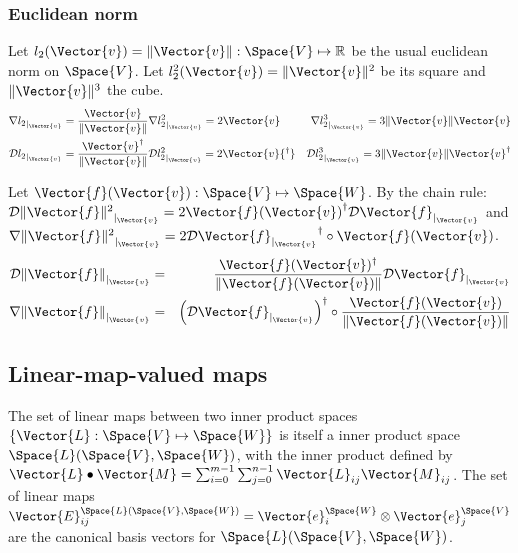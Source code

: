 
\subsubsection{Euclidean norm}
\label{sec:derivatives-of-euclidean-norm}

Let $l_2(\Vector{v}) = \| \Vector{v}  \|: \Space{V} \mapsto \Reals$
be the usual euclidean norm on $\Space{V}$.
Let $l_2^2(\Vector{v}) = \| \Vector{v}  \|^2 $
be its square and $ \| \Vector{v}  \|^3$ the cube.
\begin{eqnarray}
\label{eq:l2-gradient}
\Gb{l_2}{\Vector{v}} = \frac{ \Vector{v} }{ \| \Vector{v}  \|} &
\Gb{l_2^2}{\Vector{v}} =  2\Vector{v} &
\Gb{l_2^3}{\Vector{v}} = 3 \| \Vector{v}  \| \Vector{v} \\
\Db{l_2}{\Vector{v}} = \frac{ \Vector{v}^\dagger }{ \| \Vector{v}  \|} &
\Db{l_2^2}{\Vector{v}} = 2\Vector{v}{^\dagger} &
\Db{l_2^3}{\Vector{v}} = 3 \| \Vector{v}  \| \Vector{v}^\dagger \nonumber
\end{eqnarray}

Let $\Vector{f}(\Vector{v}) : \Space{V} \mapsto \Space{W}$.
By the chain rule:
$\Db{\| \Vector{f} \|^2}{\Vector{v}}  =  2 {\Vector{f}(\Vector{v})}^{\dagger} \Db{\Vector{f}}{\Vector{v}} $
and
$\Gb{\| \Vector{f} \|^2}{\Vector{v}}  =  2 \Db{\Vector{f}}{\Vector{v}}^\dagger \circ \Vector{f}(\Vector{v})$.
\begin{eqnarray}
\label{eq:norm_derivative}
\Db{\| \Vector{f} \|}{\Vector{v}}
& = &
\frac{\Vector{f}(\Vector{v})^\dagger}{\| \Vector{f}(\Vector{v}) \|} \Db{\Vector{f}}{\Vector{v}}  \\
\Gb{\| \Vector{f} \|}{\Vector{v}}
& = &
\left(\Db{\Vector{f}}{\Vector{v}}\right)^\dagger \circ  \frac{\Vector{f}(\Vector{v})}{ \| \Vector{f}(\Vector{v})  \|}
\label{eq:norm_gradient}
\end{eqnarray}


\subsection{Linear-map-valued maps}
\label{sec:Linear-map-valued-maps}

The set of linear maps between two inner product spaces
$\{ \Vector{L} : \Space{V} \mapsto \Space{W} \}$
is itself a inner product space $\Space{L}(\Space{V},\Space{W})$,
with the inner product defined by
$\Vector{L} \bullet \Vector{M} = \sum_{i=0}^{m-1} \sum_{j=0}^{n-1} \Vector{L}_{ij} \Vector{M}_{ij}$.
The set of linear maps
$\Vector{E}_{ij}^{\Space{L}(\Space{V},\Space{W})}  = \Vector{e}_i^{\Space{W}} \otimes \Vector{e}_j^{\Space{V}}$
are the canonical basis vectors for $\Space{L}(\Space{V},\Space{W})$.

